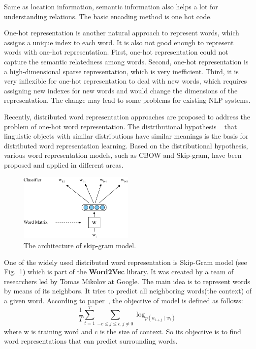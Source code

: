 Same as location information, semantic information also helps a lot for understanding relations. The basic encoding method is one hot code. 

One-hot representation is another natural approach to represent words, which assigns a unique index to each word. It is also not good enough to represent words with one-hot representation. First, one-hot representation could not capture the semantic relatedness among words. Second, one-hot representation is a high-dimensional sparse representation, which is very inefficient. Third, it is very inflexible for one-hot representation to deal with new words, which requires assigning new indexes for new words and would change the dimensions of the representation. The change may lead to some problems for existing NLP systems.

Recently, distributed word representation approaches are proposed to address the problem of one-hot word representation. The distributional hypothesis ~\cite{bojanowski2017enriching} that linguistic objects with similar distributions have similar meanings is the basis for distributed word representation learning. Based on the distributional hypothesis, various word representation models, such as CBOW and Skip-gram, have been proposed and applied in different areas.


\begin{figure}[!htbp]
	\centering
	\includegraphics[width = 0.5\textwidth]{figures/skip-gram-model.png}
	\caption[The architecture of skip-gram model]
	{ The architecture of skip-gram model.}
	\label{fig:skip-gram-model}
\end{figure}

One of the widely used distributed word representation is Skip-Gram model (see Fig.~\ref{fig:skip-gram-model}) which is part of the \textbf{Word2Vec} library. It was created by a team of researchers led by Tomas Mikolov at Google. The main idea is to represent words by means of its neighbors. It tries to predict all neighboring words(the context) of a given word. According to paper~\cite{mikolov2013distributed}, the objective of model is defined as follows:$$\frac{1}{T}\sum_{t=1}^{T}\sum_{-c\le j\le c,j\ne 0} \log_{ p(w_{t+j}\mid w_t) }$$
where w is training word and c is the size of context. So its objective is to find word representations that can predict surrounding words.

